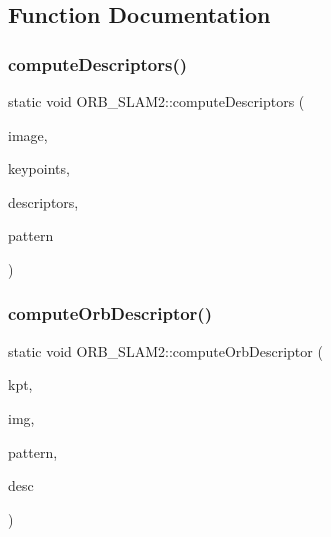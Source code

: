 \subsection{Function Documentation}
\mbox{\label{namespace_o_r_b___s_l_a_m2_ad90997cdb916a99c644c0959e08cf4df}} 
\subsubsection{\texorpdfstring{compute\+Descriptors()}{computeDescriptors()}}
{\footnotesize\ttfamily static void O\+R\+B\+\_\+\+S\+L\+A\+M2\+::compute\+Descriptors (\begin{DoxyParamCaption}\item[{const Mat \&}]{image,  }\item[{vector$<$ Key\+Point $>$ \&}]{keypoints,  }\item[{Mat \&}]{descriptors,  }\item[{const vector$<$ Point $>$ \&}]{pattern }\end{DoxyParamCaption})\hspace{0.3cm}{\ttfamily [static]}}

\mbox{\label{namespace_o_r_b___s_l_a_m2_a932693f631bfe871700d02c72e14c6cd}} 
\subsubsection{\texorpdfstring{compute\+Orb\+Descriptor()}{computeOrbDescriptor()}}
{\footnotesize\ttfamily static void O\+R\+B\+\_\+\+S\+L\+A\+M2\+::compute\+Orb\+Descriptor (\begin{DoxyParamCaption}\item[{const Key\+Point \&}]{kpt,  }\item[{const Mat \&}]{img,  }\item[{const Point $\ast$}]{pattern,  }\item[{uchar $\ast$}]{desc }\end{DoxyParamCaption})\hspace{0.3cm}{\ttfamily [static]}}



